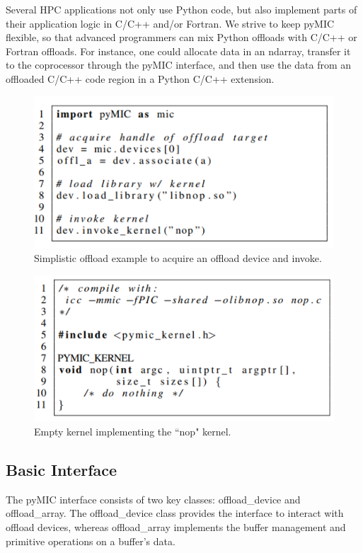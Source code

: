 \documentclass[12pt]{article}
\begin{document}
Several HPC applications not only use Python code, but also implement parts of their application logic in C/C++ and/or Fortran. We strive to keep pyMIC flexible, so that advanced programmers can mix Python offloads with C/C++ or Fortran offloads. For instance, one could allocate data in an ndarray, transfer it to the coprocessor through the pyMIC interface, and then use the data from an offloaded C/C++ code region in a Python C/C++ extension.
\begin{figure}[H]
\centering
\includegraphics[scale = 0.9]{chainer24.png}
\caption{Simplistic offload example to acquire an offload device and invoke.}
\end{figure}
\begin{figure}[H]
\centering
\includegraphics[scale = 0.9]{chainer25.png}
\caption{Empty kernel implementing the ``nop" kernel.}
\end{figure}

\subsection{Basic Interface}
The pyMIC interface consists of two key classes: offload\_device and offload\_array. The
offload\_device class provides the interface to interact with offload devices, whereas offload\_array implements the buffer management and primitive operations on a buffer's
data.
\end{document}
